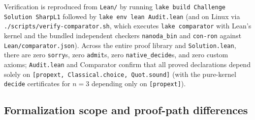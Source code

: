 \documentclass[11pt,a4paper]{article}
\newcommand{\code}[1]{\nolinkurl{#1}}
\theoremstyle{remark}
\numberwithin{equation}{section}
\begin{document}
Verification is reproduced from \code{Lean/} by running \code{lake build Challenge Solution SharpL1} followed by \code{lake env lean Audit.lean} (and on Linux via \code{./scripts/verify-comparator.sh}, which executes \code{lake comparator} with Lean's kernel and the bundled independent checkers \code{nanoda_bin} and \code{con-ron} against \code{Lean/comparator.json}). Across the entire proof library and \code{Solution.lean}, there are zero \code{sorry}s, zero \code{admit}s, zero \code{native_decide}s, and zero custom axioms; \code{Audit.lean} and Comparator confirm that all proved declarations depend solely on \code{[propext, Classical.choice, Quot.sound]} (with the pure-kernel \code{decide} certificates for $n = 3$ depending only on \code{[propext]}).

\subsection{Formalization scope and proof-path differences}
\end{document}
